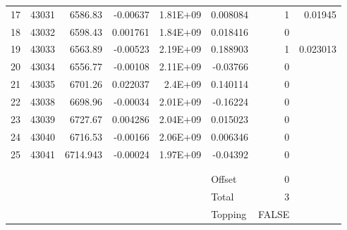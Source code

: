 \documentclass{article}
\begin{document}
\begin{table}[htbp]
\begin{tabular}{rrrrrlrr}
    17    & 43031 & 6586.83 & -0.00637 & 1.81E+09 & \multicolumn{1}{r}{0.008084} & 1     & 0.01945 \\
    18    & 43032 & 6598.43 & 0.001761 & 1.84E+09 & \multicolumn{1}{r}{0.018416} & 0     &  \\
    19    & 43033 & 6563.89 & -0.00523 & 2.19E+09 & \multicolumn{1}{r}{0.188903} & 1     & 0.023013 \\
    20    & 43034 & 6556.77 & -0.00108 & 2.11E+09 & \multicolumn{1}{r}{-0.03766} & 0     &  \\
    21    & 43035 & 6701.26 & 0.022037 & 2.4E+09 & \multicolumn{1}{r}{0.140114} & 0     &  \\
    22    & 43038 & 6698.96 & -0.00034 & 2.01E+09 & \multicolumn{1}{r}{-0.16224} & 0     &  \\
    23    & 43039 & 6727.67 & 0.004286 & 2.04E+09 & \multicolumn{1}{r}{0.015023} & 0     &  \\
    24    & 43040 & 6716.53 & -0.00166 & 2.06E+09 & \multicolumn{1}{r}{0.006346} & 0     &  \\
    25    & 43041 & 6714.943 & -0.00024 & 1.97E+09 & \multicolumn{1}{r}{-0.04392} & 0     &  \\
          &       &       &       &       &       &       &  \\
          &       &       &       &       &       &       &  \\
          &       &       &       &       & Offset & 0     &  \\
          &       &       &       &       & Total & 3     &  \\
          &       &       &       &       & Topping & FALSE &  \\
    \end{tabular}%
  \label{tab:addlabel}%
\end{table}%
\end{document}

